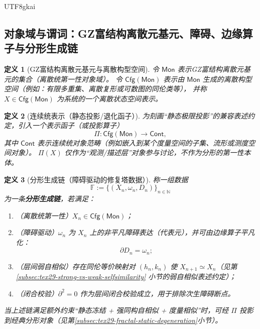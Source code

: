 \documentclass[12pt]{article}
\newtheorem{definition}{定义}[section]
\newcommand{\NN}{\mathbb{N}}
\newcommand{\KouJing}{\texorpdfstring{表述约定}{表述约定}}
\newcommand{\GZMonFull}{\texorpdfstring{GZ富结构离散元}{GZ富结构离散元}}
\newcommand{\GZMon}{\texorpdfstring{GZ富结构离散元}{GZ富结构离散元}}
\begin{document}
\begin{CJK*}{UTF8}{gkai}
\subsection{对象域与谓词：\GZMonFull{}基元、障碍、边缘算子与分形生成链}
\label{subsec:tex29-fractal-domain}

\begin{definition}[\GZMonFull{}基元与离散构型空间]
令 $\mathsf{Mon}$ 表示\GZMon{}基元的集合（离散统第一性对象域）。
令 $\mathsf{Cfg}(\mathsf{Mon})$ 表示由 $\mathsf{Mon}$ 生成的离散构型空间（例如：有限多重集、离散复形或可数图的同伦类等），
并称 $X\in\mathsf{Cfg}(\mathsf{Mon})$ 为系统的一个离散状态空间表示。
\end{definition}

\begin{definition}[连续统表示（静态投影/退化函子）]
为刻画“静态极限投影”的兼容\KouJing，引入一个表示函子（或投影算子）
\[
  \Pi:\mathsf{Cfg}(\mathsf{Mon})\longrightarrow \mathsf{Cont},
\]
其中 $\mathsf{Cont}$ 表示连续统对象范畴（例如嵌入到某个度量空间的子集、流形或测度空间对象）。
$\Pi(X)$ 仅作为“观测/描述层”对象参与讨论，不作为分形的第一性本体。
\end{definition}

\begin{definition}[分形生成链（障碍驱动的修复塔数据）]
\label{def:tex29-fractal-generation-chain}
称一组数据
\[
  \mathbb{F}:=\bigl\{(X_n,\omega_n,D_n)\bigr\}_{n\in\NN}
\]
为一条\textbf{分形生成链}，若满足：
\begin{enumerate}
  \item （离散统第一性）$X_n\in\mathsf{Cfg}(\mathsf{Mon})$；
  \item （障碍驱动）$\omega_n$ 为 $X_n$ 上的非平凡障碍表达（代表元），并可由边缘算子平凡化：
  \[
    \partial D_n=\omega_n;
  \]
  \item （层间弱自相似）存在同伦等价映射对 $(h_n,k_n)$ 使 $X_{n+1}\simeq X_n$（见第\ref{subsec:tex29-strong-vs-weak-selfsimilarity}
    小节的弱自相似\KouJing）；
  \item （闭合校验）$\partial^2=0$ 作为层间闭合校验成立，用于排除次生障碍断点。
\end{enumerate}
当上述链满足额外约束“静态冻结 + 强同构自相似 + 度量相似”时，可经 $\Pi$ 投影到经典分形对象（见第\ref{subsec:tex29-fractal-static-degeneration}小节）。
\end{definition}


\end{CJK*}
\end{document}
